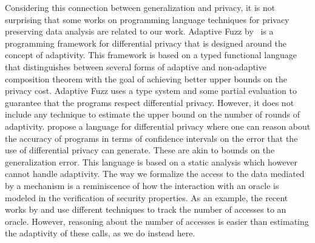 Considering this connection between generalization and privacy, it is not surprising
that some works on programming language techniques for privacy preserving data analysis are related to our work. 
Adaptive Fuzz by~\cite{Winograd-CortHR17} is a programming framework for differential privacy that is designed around the concept of adaptivity. 
This framework is based on a typed functional language that distinguishes between several forms of adaptive and non-adaptive composition theorem with the goal of achieving better upper bounds on the privacy cost.
Adaptive Fuzz uses a type system and some partial evaluation to guarantee that the programs respect differential privacy.
However, it does not include any technique to estimate the upper bound on the number of rounds of adaptivity. 
\citet{VesgaRG21} propose a language for differential privacy where one can reason about the accuracy of programs in terms of confidence intervals on the error that the use of differential privacy can generate. These are akin to bounds on the generalization error. This language is based on a static analysis which however cannot handle adaptivity. 
%
The way we formalize the access to the data mediated by a mechanism is a reminiscence of how the interaction with an oracle is modeled in the verification of security properties. As an example, the recent works by \citet{BarbosaBGKS21} and \citet{AguirreBGGKS21} use different techniques to track the number of accesses to an oracle. However, reasoning about the number of accesses is easier than estimating the adaptivity of these calls, as we do instead here.

